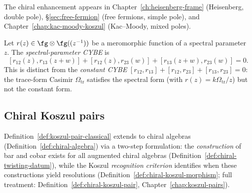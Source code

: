 The chiral enhancement appears in Chapter~\ref{ch:heisenberg-frame} (Heisenberg, double pole), \S\ref{sec:free-fermion} (free fermions, simple pole), and Chapter~\ref{chap:kac-moody-koszul} (Kac--Moody, mixed poles).

\begin{definition}
\label{def:spectral-cybe}
Let $r(z) \in \fg\otimes\fg((z^{-1}))$ be a meromorphic function of a spectral parameter~$z$. The \emph{spectral-parameter CYBE} is
\[
[r_{12}(z), r_{13}(z{+}w)] + [r_{12}(z), r_{23}(w)] + [r_{13}(z{+}w), r_{23}(w)] = 0.
\]
This is distinct from the \emph{constant CYBE} $[r_{12}, r_{13}] + [r_{12}, r_{23}] + [r_{13}, r_{23}] = 0$: the trace-form Casimir $\Omega_{\mathrm{tr}}$ satisfies the spectral form (with $r(z)=k\Omega_{\mathrm{tr}}/z$) but not the constant form. %
\end{definition}

\subsection{Chiral Koszul pairs}
\label{subsec:chiral-koszul-pairs-precise}

Definition~\ref{def:koszul-pair-classical} extends to chiral algebras (Definition~\ref{def:chiral-algebra}) via a two-step formulation: the \emph{construction} of bar and cobar exists for all augmented chiral algebras (Definition~\ref{def:chiral-twisting-datum}), while the Koszul \emph{recognition criterion} identifies when these constructions yield resolutions (Definition~\ref{def:chiral-koszul-morphism}; full treatment: Definition~\ref{def:chiral-koszul-pair}, Chapter~\ref{chap:koszul-pairs}).

